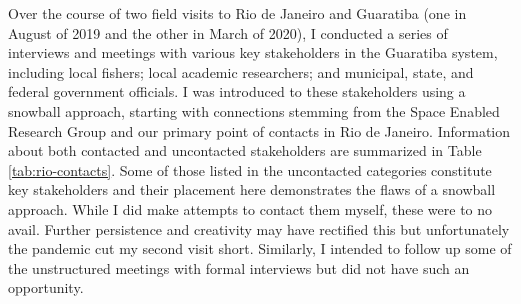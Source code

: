 Over the course of two field visits to Rio de Janeiro and Guaratiba (one in August of 2019 and the other in March of 2020), I conducted a series of interviews and meetings with various key stakeholders in the Guaratiba system, including local fishers; local academic researchers; and municipal, state, and federal government officials. I was introduced to these stakeholders using a snowball approach, starting with connections stemming from the Space Enabled Research Group and our primary point of contacts in Rio de Janeiro. Information about both contacted and uncontacted stakeholders are summarized in Table \ref{tab:rio-contacts}. Some of those listed in the uncontacted categories constitute key stakeholders and their placement here demonstrates the flaws of a snowball approach. While I did make attempts to contact them myself, these were to no avail. Further persistence and creativity may have rectified this but unfortunately the pandemic cut my second visit short. Similarly, I intended to follow up some of the unstructured meetings with formal interviews but did not have such an opportunity.

